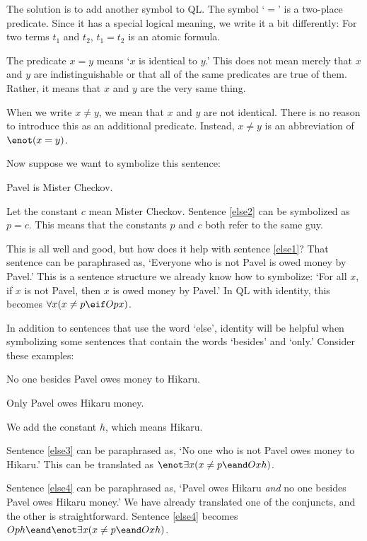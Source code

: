 The solution is to add another symbol to QL. The symbol `$=$' is a two-place predicate. Since it has a special logical meaning, we write it a bit differently: For two terms $t_1$ and $t_2$, $t_1=t_2$ is an atomic formula.

The predicate $x=y$ means `$x$ is identical to $y$.' This does not mean merely that $x$ and $y$ are indistinguishable or that all of the same predicates are true of them. Rather, it means that $x$ and $y$ are the very same thing.

When we write $x \neq y$, we mean that $x$ and $y$ are not identical. There is no reason to introduce this as an additional predicate. Instead, $x \neq y$ is an abbreviation of $\enot(x = y)$.

Now suppose we want to symbolize this sentence:
\begin{earg}
\item[\ex{else2}] Pavel is Mister Checkov.
\end{earg}
Let the constant $c$ mean Mister Checkov. Sentence \ref{else2} can be symbolized as $p=c$. This means that the constants $p$ and $c$ both refer to the same guy.

This is all well and good, but how does it help with sentence \ref{else1}? That sentence can be paraphrased as, `Everyone who is not Pavel is owed money by Pavel.' This is a sentence structure we already know how to symbolize: `For all $x$, if $x$ is not Pavel, then $x$ is owed money by Pavel.' In QL with identity, this becomes $\forall x (x\neq p \eif Opx)$.

In addition to sentences that use the word `else', identity will be helpful when symbolizing some sentences that contain the words `besides' and `only.' Consider these examples:

\begin{earg}
\item[\ex{else3}] No one besides Pavel owes money to Hikaru.
\item[\ex{else4}] Only Pavel owes Hikaru money.
\end{earg}


We add the constant $h$, which means Hikaru.

Sentence \ref{else3} can be paraphrased as, `No one who is not Pavel owes money to Hikaru.' This can be translated as $\enot\exists x(x\neq p \eand Oxh)$.

Sentence \ref{else4} can be paraphrased as, `Pavel owes Hikaru \emph{and} no one besides Pavel owes Hikaru money.' We have already translated one of the conjuncts, and the other is straightforward. Sentence \ref{else4} becomes $Oph \eand \enot\exists x(x\neq p \eand Oxh)$.


